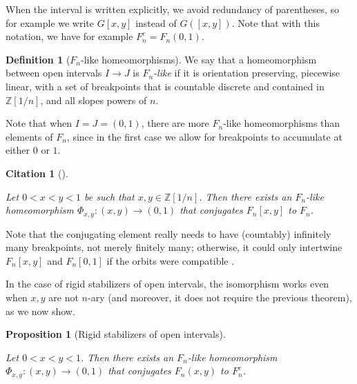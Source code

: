 \documentclass[reqno,12pt]{amsart}\setcounter{tocdepth}{1}
\newtheorem{proposition}[theorem]{Proposition}
\newtheorem{cit}[theorem]{Citation}
\theoremstyle{definition}
\newtheorem{definition}[theorem]{Definition}
\newcommand{\Z}{\mathbb{Z}}
\numberwithin{equation}{section}
\begin{document}
When the interval is written explicitly, we avoid redundancy of parentheses, so for example we write $G[x, y]$ instead of $G([x, y])$. Note that with this notation, we have for example $F_n^c = F_n(0, 1)$.

\begin{definition}[$F_n$-like homeomorphisms]
We say that a homeomorphism between open intervals $I \to J$ is \emph{$F_n$-like} if it is orientation preserving, piecewise linear, with a set of breakpoints that is countable discrete and contained in $\Z[1/n]$, and all slopes powers of $n$.
\end{definition}

Note that when $I = J = (0, 1)$, there are more $F_n$-like homeomorphisms than elements of $F_n$, since in the first case we allow for breakpoints to accumulate at either $0$ or $1$.

\begin{cit}[{\cite[Theorem E16.7]{bieristrebel}}]
\label{cit:bieristrebel}

Let $0 < x < y < 1$ be such that $x, y \in \Z[1/n]$. Then there exists an $F_n$-like homeomorphism $\Phi_{x, y} \colon (x, y) \to (0, 1)$ that conjugates $F_n[x, y]$ to $F_n$.
\end{cit}

Note that the conjugating element really needs to have (countably) infinitely many breakpoints, not merely finitely many; otherwise, it could only intertwine $F_n[x, y]$ and $F_n[0, 1]$ if the orbits were compatible \cite{hydelodha}.

In the case of rigid stabilizers of open intervals, the isomorphism works even when $x, y$ are not $n$-ary (and moreover, it does not require the previous theorem), as we now show.

\begin{proposition}[Rigid stabilizers of open intervals]
\label{prop:rstab:open}

Let $0 < x < y < 1$. Then there exists an $F_n$-like homeomorphism $\Phi_{x, y} \colon (x, y) \to (0, 1)$ that conjugates $F_n(x, y)$ to $F_n^c$.
\end{proposition}
\end{document}
